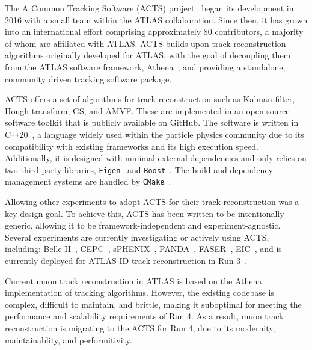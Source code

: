 
The A Common Tracking Software (ACTS) project~\cite{Salzburger_A_Common_Tracking_2021, Ai:2021ghi} began its development in 2016 with a small team within the ATLAS collaboration. Since then, it has grown into an international effort comprising approximately 80 contributors, a majority of whom are affiliated with ATLAS\@. ACTS builds upon track reconstruction algorithms originally developed for ATLAS, with the goal of decoupling them from the ATLAS software framework, Athena~\cite{atlas_collaboration_2021_4772550}, and providing a standalone, community driven tracking software package.

ACTS offers a set of algorithms for track reconstruction such as Kalman filter, Hough transform, GS, and AMVF\@. These are implemented in an open-source software toolkit that is publicly available on GitHub. The software is written in C\texttt{++}20~\cite{iso_cpp20}, a language widely used within the particle physics community due to its compatibility with existing frameworks and its high execution speed. Additionally, it is designed with minimal external dependencies and only relies on two third-party libraries, \texttt{Eigen}~\cite{eigenweb} and \texttt{Boost}~\cite{boost}. The build and dependency management systems are handled by \texttt{CMake}~\cite{cmake}.

Allowing other experiments to adopt ACTS for their track reconstruction was a key design goal. To achieve this, ACTS has been written to be intentionally generic, allowing it to be framework-independent and experiment-agnostic. Several experiments are currently investigating or actively using ACTS, including: Belle II~\cite{Belle-II:2010dht}, CEPC~\cite{CEPCStudyGroup:2023quu}, sPHENIX~\cite{Osborn:2021zlr}, PANDA~\cite{SMYRSKI201285}, FASER~\cite{FASER:2022hcn}, EIC~\cite{osti_1765663}, and is currently deployed for ATLAS ID track reconstruction in Run 3~\cite{Mlinarevic:2024ntj}. 

Current muon track reconstruction in ATLAS is based on the Athena implementation of tracking algorithms. However, the existing codebase is complex, difficult to maintain, and brittle, making it suboptimal for meeting the performance and scalability requirements of Run 4. As a result, muon track reconstruction is migrating to the ACTS for Run 4, due to its modernity, maintainablity, and performitivity.


